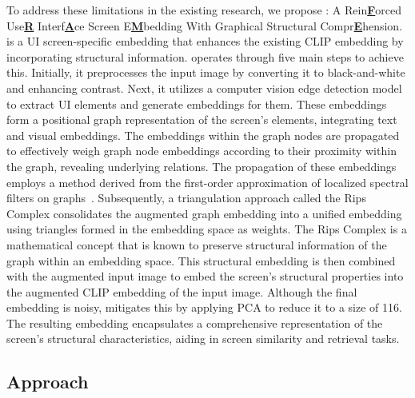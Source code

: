 To address these limitations in the existing research, we propose \FRAME: A Rein\textbf{\underline{F}}orced Use\textbf{\underline{R}} Interf\textbf{\underline{A}}ce Screen E\textbf{\underline{M}}bedding With Graphical Structural Compr\textbf{\underline{E}}hension. \FRAME is a UI screen-specific embedding that enhances the existing CLIP embedding by incorporating structural information. \FRAME operates through five main steps to achieve this. Initially, it preprocesses the input image by converting it to black-and-white and enhancing contrast. Next, it utilizes a computer vision edge detection model to extract UI elements and generate embeddings for them. These embeddings form a positional graph representation of the screen's elements, integrating text and visual embeddings. The embeddings within the graph nodes are propagated to effectively weigh graph node embeddings according to their proximity within the graph, revealing underlying relations. The propagation of these embeddings employs a method derived from the first-order approximation of localized spectral filters on graphs~\cite{kipf2016semi, defferrard2016convolutional}. Subsequently, a triangulation approach called the Rips Complex consolidates the augmented graph embedding into a unified embedding using triangles formed in the embedding space as weights. The Rips Complex is a mathematical concept that is known to preserve structural information of the graph within an embedding space. This structural embedding is then combined with the augmented input image to embed the screen's structural properties into the augmented CLIP embedding of the input image. Although the final embedding is noisy, \FRAME mitigates this by applying PCA to reduce it to a size of 116. The resulting embedding encapsulates a comprehensive representation of the screen's structural characteristics, aiding in screen similarity and retrieval tasks. 




\subsection{Approach}

